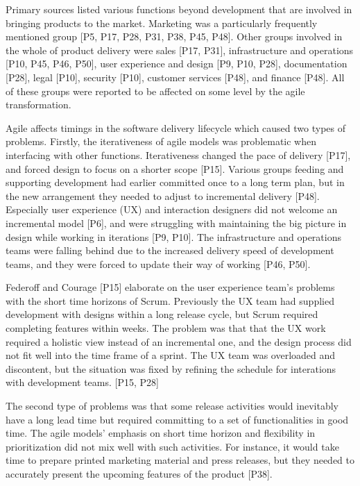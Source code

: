 \documentclass[preprint,authoryear,12pt]{elsarticle}
\begin{document}
Primary sources listed various functions beyond development that are involved in
bringing products to the market. Marketing was a particularly frequently
mentioned group [P5, P17, P28, P31, P38, P45, P48]. Other groups involved in the
whole of product delivery were sales [P17, P31], infrastructure and operations
[P10, P45, P46, P50], user experience and design [P9, P10, P28], documentation
[P28], legal [P10], security [P10], customer services [P48], and finance [P48].
All of these groups were reported to be affected on some level by the agile
transformation.

Agile affects timings in the software delivery lifecycle which caused two types
of problems. Firstly, the iterativeness of agile models was problematic when
interfacing with other functions. Iterativeness changed the pace of delivery
[P17], and forced design to focus on a shorter scope [P15]. Various groups
feeding and supporting development had earlier committed once to a long term
plan, but in the new arrangement they needed to adjust to incremental delivery
[P48].
Especially user experience (UX) and interaction designers did not welcome an
incremental model [P6], and were struggling with maintaining the big picture in
design while working in iterations [P9, P10].
The infrastructure and operations teams were falling behind due to the increased
delivery speed of development teams, and they were forced to update their way of
working [P46, P50].

Federoff and Courage [P15] elaborate on the user experience team's problems
with the short time horizons of Scrum. Previously the UX team had supplied
development with designs within a long release cycle, but Scrum required
completing features within weeks. The problem was that that the UX work required
a holistic view instead of an incremental one, and the design process did not
fit well into the time frame of a sprint. The UX team was overloaded and
discontent, but the situation was fixed by refining the schedule for interations
with development teams. [P15, P28]

The second type of problems was that some release activities would inevitably
have a long lead time but required committing to a set of functionalities in
good time. The agile models' emphasis on short time horizon and flexibility in
prioritization did not mix well with such activities.
For instance, it would take time to prepare printed marketing material and press
releases, but they needed to accurately present the upcoming features of the
product [P38].
\end{document}
